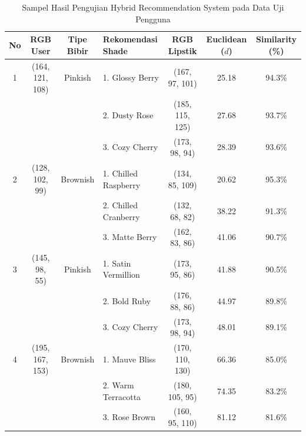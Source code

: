 \documentclass[10pt,a4paper]{article}
\begin{document}
\begin{table}[htbp]
  \centering
  \caption{Sampel Hasil Pengujian Hybrid Recommendation System pada Data Uji Pengguna}
  \label{tab:hasil_rekomendasi}
  \fontsize{8.5pt}{10.5pt}\selectfont
  \begin{tabular}{ccclccc}
    \toprule
    \textbf{No} & \textbf{RGB User} & \textbf{Tipe Bibir} & \textbf{Rekomendasi Shade} & \textbf{RGB Lipstik} & \textbf{Euclidean ($d$)} & \textbf{Similarity (\%)} \\
    \midrule
    1 & (164, 121, 108) & Pinkish  & 1. Glossy Berry     & (167, 97, 101)  & 25.18 & 94.3\% \\
      &                 &          & 2. Dusty Rose       & (185, 115, 125) & 27.68 & 93.7\% \\
      &                 &          & 3. Cozy Cherry      & (173, 98, 94)   & 28.39 & 93.6\% \\
    \midrule
    2 & (128, 102, 99)  & Brownish & 1. Chilled Raspberry& (134, 85, 109)  & 20.62 & 95.3\% \\
      &                 &          & 2. Chilled Cranberry& (132, 68, 82)   & 38.22 & 91.3\% \\
      &                 &          & 3. Matte Berry      & (162, 83, 86)   & 41.06 & 90.7\% \\
    \midrule
    3 & (145, 98, 55)   & Pinkish  & 1. Satin Vermillion & (173, 95, 86)   & 41.88 & 90.5\% \\
      &                 &          & 2. Bold Ruby        & (176, 88, 86)   & 44.97 & 89.8\% \\
      &                 &          & 3. Cozy Cherry      & (173, 98, 94)   & 48.01 & 89.1\% \\
    \midrule
    4 & (195, 167, 153) & Brownish & 1. Mauve Bliss      & (170, 110, 130) & 66.36 & 85.0\% \\
      &                 &          & 2. Warm Terracotta  & (180, 105, 95)  & 74.35 & 83.2\% \\
      &                 &          & 3. Rose Brown       & (160, 95, 110)  & 81.12 & 81.6\% \\
    \bottomrule
  \end{tabular}
\end{table}
\end{document}
